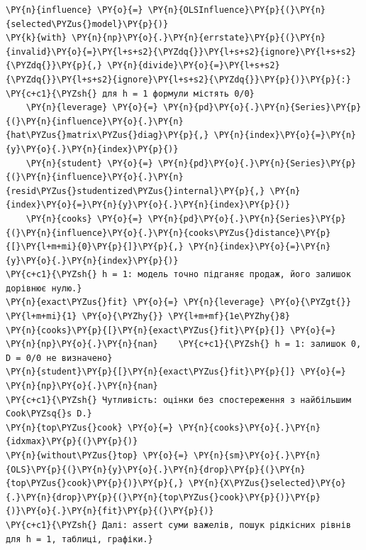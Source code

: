 \begin{Verbatim}[commandchars=\\\{\}]
\PY{n}{influence} \PY{o}{=} \PY{n}{OLSInfluence}\PY{p}{(}\PY{n}{selected\PYZus{}model}\PY{p}{)}
\PY{k}{with} \PY{n}{np}\PY{o}{.}\PY{n}{errstate}\PY{p}{(}\PY{n}{invalid}\PY{o}{=}\PY{l+s+s2}{\PYZdq{}}\PY{l+s+s2}{ignore}\PY{l+s+s2}{\PYZdq{}}\PY{p}{,} \PY{n}{divide}\PY{o}{=}\PY{l+s+s2}{\PYZdq{}}\PY{l+s+s2}{ignore}\PY{l+s+s2}{\PYZdq{}}\PY{p}{)}\PY{p}{:}  \PY{c+c1}{\PYZsh{} для h = 1 формули містять 0/0}
    \PY{n}{leverage} \PY{o}{=} \PY{n}{pd}\PY{o}{.}\PY{n}{Series}\PY{p}{(}\PY{n}{influence}\PY{o}{.}\PY{n}{hat\PYZus{}matrix\PYZus{}diag}\PY{p}{,} \PY{n}{index}\PY{o}{=}\PY{n}{y}\PY{o}{.}\PY{n}{index}\PY{p}{)}
    \PY{n}{student} \PY{o}{=} \PY{n}{pd}\PY{o}{.}\PY{n}{Series}\PY{p}{(}\PY{n}{influence}\PY{o}{.}\PY{n}{resid\PYZus{}studentized\PYZus{}internal}\PY{p}{,} \PY{n}{index}\PY{o}{=}\PY{n}{y}\PY{o}{.}\PY{n}{index}\PY{p}{)}
    \PY{n}{cooks} \PY{o}{=} \PY{n}{pd}\PY{o}{.}\PY{n}{Series}\PY{p}{(}\PY{n}{influence}\PY{o}{.}\PY{n}{cooks\PYZus{}distance}\PY{p}{[}\PY{l+m+mi}{0}\PY{p}{]}\PY{p}{,} \PY{n}{index}\PY{o}{=}\PY{n}{y}\PY{o}{.}\PY{n}{index}\PY{p}{)}
\PY{c+c1}{\PYZsh{} h = 1: модель точно підганяє продаж, його залишок дорівнює нулю.}
\PY{n}{exact\PYZus{}fit} \PY{o}{=} \PY{n}{leverage} \PY{o}{\PYZgt{}} \PY{l+m+mi}{1} \PY{o}{\PYZhy{}} \PY{l+m+mf}{1e\PYZhy{}8}
\PY{n}{cooks}\PY{p}{[}\PY{n}{exact\PYZus{}fit}\PY{p}{]} \PY{o}{=} \PY{n}{np}\PY{o}{.}\PY{n}{nan}    \PY{c+c1}{\PYZsh{} h = 1: залишок 0, D = 0/0 не визначено}
\PY{n}{student}\PY{p}{[}\PY{n}{exact\PYZus{}fit}\PY{p}{]} \PY{o}{=} \PY{n}{np}\PY{o}{.}\PY{n}{nan}
\PY{c+c1}{\PYZsh{} Чутливість: оцінки без спостереження з найбільшим Cook\PYZsq{}s D.}
\PY{n}{top\PYZus{}cook} \PY{o}{=} \PY{n}{cooks}\PY{o}{.}\PY{n}{idxmax}\PY{p}{(}\PY{p}{)}
\PY{n}{without\PYZus{}top} \PY{o}{=} \PY{n}{sm}\PY{o}{.}\PY{n}{OLS}\PY{p}{(}\PY{n}{y}\PY{o}{.}\PY{n}{drop}\PY{p}{(}\PY{n}{top\PYZus{}cook}\PY{p}{)}\PY{p}{,} \PY{n}{X\PYZus{}selected}\PY{o}{.}\PY{n}{drop}\PY{p}{(}\PY{n}{top\PYZus{}cook}\PY{p}{)}\PY{p}{)}\PY{o}{.}\PY{n}{fit}\PY{p}{(}\PY{p}{)}
\PY{c+c1}{\PYZsh{} Далі: assert суми важелів, пошук рідкісних рівнів для h = 1, таблиці, графіки.}
\end{Verbatim}
